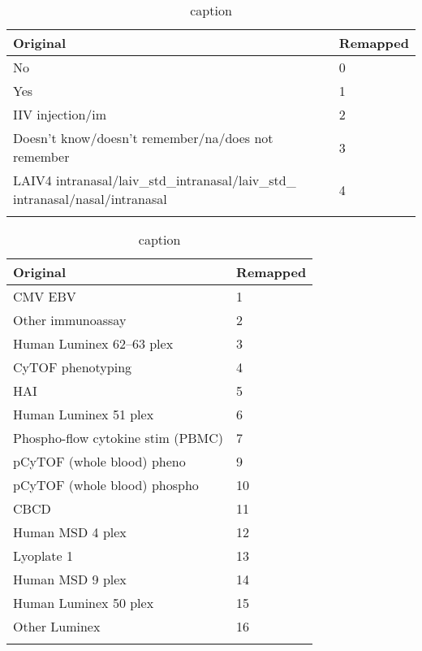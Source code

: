 \begin{appendices}
    \begin{table}
        \begin{tabular}{ll}
            \toprule{}
            Original & Remapped \\
            \midrule{}
            No& 0 \\
            Yes& 1 \\
            IIV injection/im& 2 \\
            Doesn’t know/doesn’t remember/na/does not remember& 3 \\
            LAIV4 intranasal/laiv\_std\_intranasal/laiv\_std\_ intranasal/nasal/intranasal& 4 \\
            \bottomrule{}
        \end{tabular}
        \caption{caption}\label{tbl:remapHistory}
    \end{table}

    \begin{table}
        \begin{tabular}{ll}
            \toprule{}
            Original & Remapped \\
            \midrule{}
            CMV EBV & 1 \\
            Other immunoassay & 2 \\
            Human Luminex 62–63 plex & 3 \\
            CyTOF phenotyping & 4 \\
            HAI & 5 \\
            Human Luminex 51 plex & 6 \\
            Phospho-flow cytokine stim (PBMC) & 7 \\
            pCyTOF (whole blood) pheno & 9 \\
            pCyTOF (whole blood) phospho & 10 \\
            CBCD & 11 \\
            Human MSD 4 plex & 12 \\
            Lyoplate 1 & 13 \\
            Human MSD 9 plex & 14 \\
            Human Luminex 50 plex & 15 \\
            Other Luminex & 16 \\
            \bottomrule{}
        \end{tabular}
        \caption{caption}\label{tbl:remapAssays}
    \end{table}
\end{appendices}


